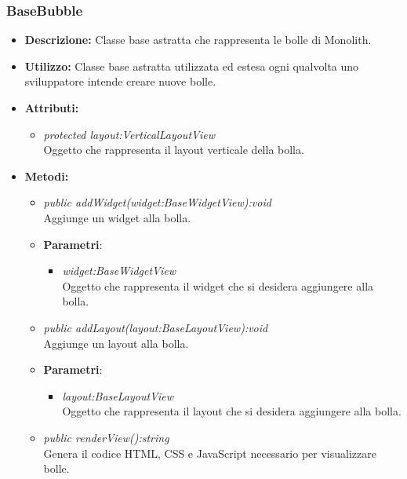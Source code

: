 \subsubsection{BaseBubble}
\begin{itemize}
\item \textbf{Descrizione:} Classe base astratta che rappresenta le bolle di Monolith.
\item \textbf{Utilizzo:} Classe base astratta utilizzata ed estesa ogni qualvolta uno sviluppatore intende creare nuove bolle.
\item \textbf{Attributi:} 
\begin{itemize}
\item \textit{protected layout:VerticalLayoutView}\\
Oggetto che rappresenta il layout verticale della bolla.
\end{itemize}
\item \textbf{Metodi:}
\begin{itemize}
\item \textit{public addWidget(widget:BaseWidgetView):void}\\
Aggiunge un widget alla bolla.
\item{\textbf{Parametri}: \begin{itemize}
\item \textit{widget:BaseWidgetView}\\
Oggetto che rappresenta il widget che si desidera aggiungere alla bolla.
\end{itemize}}
\item \textit{public addLayout(layout:BaseLayoutView):void}\\
Aggiunge un layout alla bolla.
\item{\textbf{Parametri}: \begin{itemize}
\item \textit{layout:BaseLayoutView}\\
Oggetto che rappresenta il layout che si desidera aggiungere alla bolla.
\end{itemize}}
\item \textit{public renderView():string}\\
Genera il codice HTML, CSS e JavaScript necessario per visualizzare bolle.
\end{itemize}
\end{itemize}

